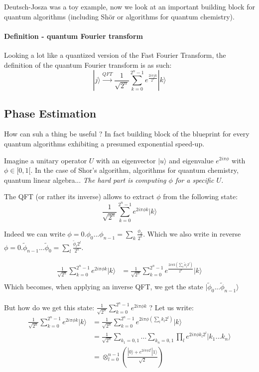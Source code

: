 \documentclass{article}
\begin{document}
Deutsch-Josza was a toy example, now we look at an important 
building block for quantum algorithms (including Sh\"{o}r or
algorithms for quantum chemistry).

\paragraph{Definition - quantum Fourier transform} Looking a lot like a quantized version of the Fast Fourier Transform, the definition of the quantum Fourier
transform is as such:
$$ |j\rangle \xrightarrow[]{QFT} \frac{1}{\sqrt{2^n}} \sum_{k=0}^{2^n-1} e^{\frac{2i\pi jk}{2^n}} |k\rangle $$

\subsection{Phase Estimation}

How can suh a thing be useful ? In fact building block of the blueprint for every 
quantum algorithms exhibiting a presumed exponential speed-up.

Imagine a unitary operator $U$ with an eigenvector $|u\rangle$ and
eigenvalue $e^{2i\pi \phi}$ with $\phi\in[0,1[$. In the case of Shor's algorithm,
algorithms for quantum chemistry, quantum linear algebra... \emph{The hard part is 
computing $\phi$ for a specific $U$.}

The QFT (or rather its inverse) allows to extract $\phi$ from the following state:
$$\frac{1}{\sqrt{2^n}}\sum_{k=0}^{2^n-1} e^{2i\pi\phi k}  |k\rangle$$

Indeed we can write $\phi=0.\phi_0...\phi_{n-1}=\sum_{k}\frac{\phi_k}{2^k}$.
Which we also write in reverse $\phi=0.\tilde{\phi}_{n-1}...\tilde{\phi}_0=
\sum_{l}\frac{\tilde{\phi}_l 2^l}{2^n}$.

\begin{align*}
  \frac{1}{\sqrt{2^n}}  \sum_{k=0}^{2^n-1} e^{2i\pi\phi k}  |k\rangle &= \frac{1}{\sqrt{2^n}}\sum_{k=0}^{2^n-1} e^{\frac{2i\pi k \left(\sum_l{\tilde{\phi}_l 2^l}\right)}{2^n} }  |k\rangle \\ 
\end{align*}
Which becomes, when applying an inverse QFT, we get the state $|\tilde{\phi}_0...\tilde{\phi}_{n-1}\rangle$

\paragraph{} But how do we get this state: $\frac{1}{\sqrt{2^n}}\sum_{k=0}^{2^n-1} e^{2i\pi\phi k} $ ? 
Let us write:
\begin{align*}
 \frac{1}{\sqrt{2^n}}   \sum_{k=0}^{2^n-1} e^{2i\pi\phi k} |k\rangle &= \frac{1}{\sqrt{2^n}} \sum_{k=0}^{2^n-1} e^{2i\pi\phi \left(\sum_{l} k_l 2^l\right)} |k\rangle \\
    &= \frac{1}{\sqrt{2^n}}\sum_{k_1=0,1}...\sum_{k_n=0,1} \prod_{l} e^{2i\pi\phi k_l 2^l} |k_1...k_n\rangle \\
    &= \otimes_{l=0}^{n-1} \left(\frac{|0\rangle+e^{2i\pi\phi 2^l}|1\rangle}{\sqrt{2}}\right)
\end{align*}
\end{document}
